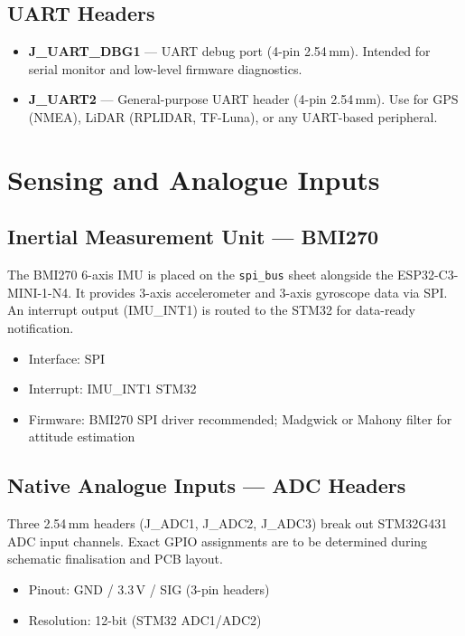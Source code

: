 \documentclass[11pt,a4paper]{article}
\begin{document}
\subsection{UART Headers}

\begin{itemize}
  \item \textbf{J\_UART\_DBG1} --- UART debug port (4-pin 2.54\,mm). Intended for serial monitor and low-level firmware diagnostics.
  \item \textbf{J\_UART2} --- General-purpose UART header (4-pin 2.54\,mm). Use for GPS (NMEA), LiDAR (RPLIDAR, TF-Luna), or any UART-based peripheral.
\end{itemize}

\section{Sensing and Analogue Inputs}

\subsection{Inertial Measurement Unit --- BMI270}

The BMI270 6-axis IMU is placed on the \texttt{spi\_bus} sheet alongside the ESP32-C3-MINI-1-N4. It provides 3-axis accelerometer and 3-axis gyroscope data via SPI. An interrupt output (IMU\_INT1) is routed to the STM32 for data-ready notification.

\begin{itemize}
  \item Interface: SPI
  \item Interrupt: IMU\_INT1 \textrightarrow{} STM32
  \item Firmware: BMI270 SPI driver recommended; Madgwick or Mahony filter for attitude estimation
\end{itemize}

\subsection{Native Analogue Inputs --- ADC Headers}

Three 2.54\,mm headers (J\_ADC1, J\_ADC2, J\_ADC3) break out STM32G431 ADC input channels. Exact GPIO assignments are to be determined during schematic finalisation and PCB layout.

\begin{itemize}
  \item Pinout: GND / 3.3\,V / SIG (3-pin headers)
  \item Resolution: 12-bit (STM32 ADC1/ADC2)
\end{itemize}
\end{document}
